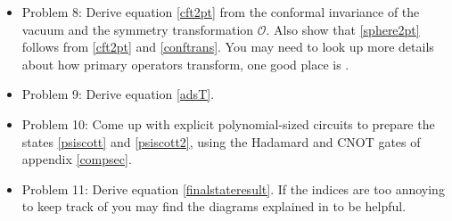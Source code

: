 \documentclass[12pt]{article}
\begin{document}
\begin{itemize}
\item Problem 8: Derive equation \eqref{cft2pt} from the conformal invariance of the vacuum and the symmetry transformation $\mathcal{O}$.  Also show that \eqref{sphere2pt} follows from \eqref{cft2pt} and \eqref{conftrans}.  You may need to look up more details about how primary operators transform, one good place is \cite{Aharony:1999ti}.
\item Problem 9: Derive equation \eqref{adsT}.
\item Problem 10: Come up with explicit polynomial-sized circuits to prepare the states \eqref{psiscott} and \eqref{psiscott2}, using the Hadamard and CNOT gates of appendix \ref{compsec}.
\item Problem 11: Derive equation \eqref{finalstateresult}.  If the indices are too annoying to keep track of you may find the diagrams explained in \cite{Bousso:2013uka} to be helpful.
\end{itemize}


\end{document}
